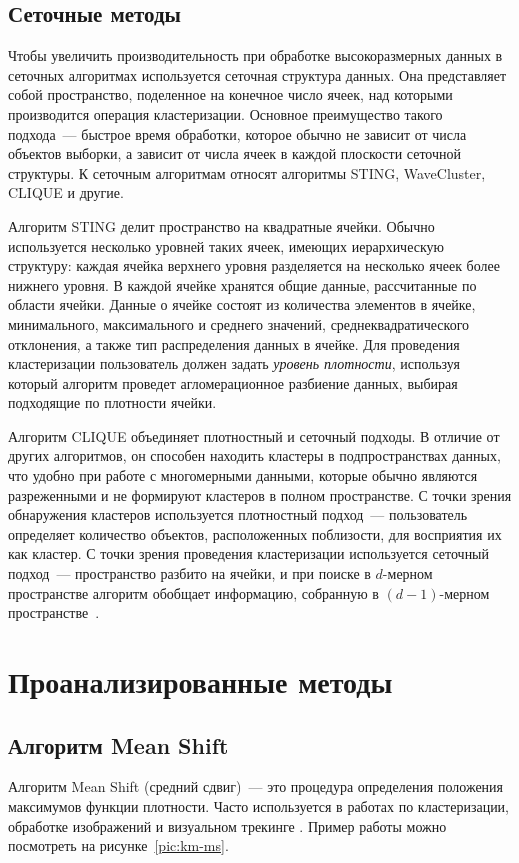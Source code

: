 \subsection{Сеточные методы}
Чтобы увеличить производительность при обработке высокоразмерных данных в сеточных алгоритмах используется сеточная структура данных. Она представляет собой пространство, поделенное на конечное число ячеек, над которыми производится операция кластеризации. Основное преимущество такого подхода~--- быстрое время обработки, которое обычно не зависит от числа объектов выборки, а зависит от числа ячеек в каждой плоскости сеточной структуры. К сеточным алгоритмам относят алгоритмы STING, WaveCluster, CLIQUE и другие.

Алгоритм STING делит пространство на квадратные ячейки. Обычно используется несколько уровней таких ячеек, имеющих иерархическую структуру: каждая ячейка верхнего уровня разделяется на несколько ячеек более нижнего уровня. В каждой ячейке хранятся общие данные, рассчитанные по области ячейки. Данные о ячейке состоят из количества элементов в ячейке, минимального, максимального и среднего значений, среднеквадратического отклонения, а также тип распределения данных в ячейке. Для проведения кластеризации пользователь должен задать \emph{уровень плотности}, используя который алгоритм проведет агломерационное разбиение данных, выбирая подходящие по плотности ячейки.

Алгоритм CLIQUE объединяет плотностный и сеточный подходы. В отличие от других алгоритмов, он способен находить кластеры в подпространствах данных, что удобно при работе с многомерными данными, которые обычно являются разреженными и не формируют кластеров в полном пространстве. С точки зрения обнаружения кластеров используется плотностный подход~--- пользователь определяет количество объектов, расположенных поблизости, для восприятия их как кластер. С точки зрения проведения кластеризации используется сеточный подход~--- пространство разбито на ячейки, и при поиске в \( d \)-мерном пространстве алгоритм обобщает информацию, собранную в \( (d - 1) \)-мерном пространстве~\cite{cod}.

\section{Проанализированные методы}
\subsection{Алгоритм Mean Shift}
Алгоритм Mean Shift (средний сдвиг)~--- это процедура определения положения максимумов функции плотности. Часто используется в работах по кластеризации, обработке изображений и визуальном трекинге \cite{ms, meanshift}. Пример работы можно посмотреть на рисунке~\ref{pic:km-ms}.

